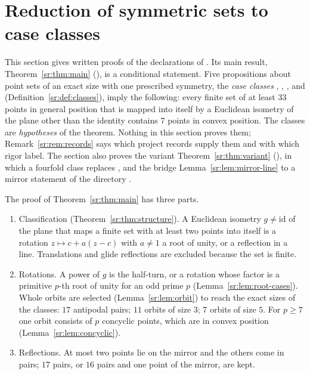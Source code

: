 \section{Reduction of symmetric sets to case classes}\label{sr:sec}

This section gives written proofs of the declarations of . Its main result,
Theorem~\ref{sr:thm:main} (), is a conditional statement. Five propositions
about point sets of an exact size with one prescribed symmetry, the \emph{case classes} ,
, ,  and 
(Definition~\ref{sr:def:classes}), imply the following: every finite set of at least $33$ points in general position
that is mapped into itself by a Euclidean isometry of the plane other than the identity contains $7$ points in convex
position. The classes are \emph{hypotheses} of the theorem. Nothing in this section proves them;
Remark~\ref{sr:rem:records} says which project records supply them and with which rigor label. The section also proves
the variant Theorem~\ref{sr:thm:variant} (), in which a fourfold class
 replaces , and the bridge Lemma~\ref{sr:lem:mirror-line} to a mirror statement of
the directory .

The proof of Theorem~\ref{sr:thm:main} has three parts.
\begin{enumerate}
\item Classification (Theorem~\ref{sr:thm:structure}). A Euclidean isometry $g\ne\mathrm{id}$ of the plane that maps
  a finite set with at least two points into itself is a rotation $z\mapsto c+a(z-c)$ with $a\ne1$ a root of unity, or a
  reflection in a line. Translations and glide reflections are excluded because the set is finite.
\item Rotations. A power of $g$ is the half-turn, or a rotation whose factor is a primitive $p$-th root of unity for an
  odd prime $p$ (Lemma~\ref{sr:lem:root-cases}). Whole orbits are selected (Lemma~\ref{sr:lem:orbit}) to reach the
  exact sizes of the classes: $17$ antipodal pairs; $11$ orbits of size $3$; $7$ orbits of size $5$. For $p\ge7$ one
  orbit consists of $p$ concyclic points, which are in convex position (Lemma~\ref{sr:lem:concyclic}).
\item Reflections. At most two points lie on the mirror and the others come in pairs; $17$ pairs, or $16$ pairs and one
  point of the mirror, are kept.
\end{enumerate}

